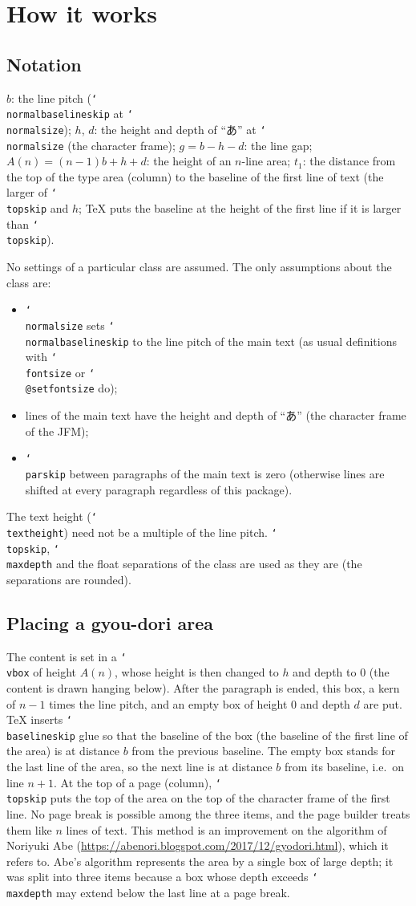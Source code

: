 \documentclass[paper=a4,dvipdfmx]{jlreq}
\newcommand\cs[1]{\texttt{\char`\\#1}}
\begin{document}
\section{How it works}

\subsection{Notation}

$b$: the line pitch (\cs{normalbaselineskip} at \cs{normalsize});
$h$, $d$: the height and depth of ``あ'' at \cs{normalsize} (the character
frame); $g=b-h-d$: the line gap; $A(n)=(n-1)b+h+d$: the height of an $n$-line
area; $t_1$: the distance from the top of the type area (column) to the baseline
of the first line of text (the larger of \cs{topskip} and $h$; \TeX{} puts the
baseline at the height of the first line if it is larger than \cs{topskip}).

No settings of a particular class are assumed. The only assumptions about the
class are:
\begin{itemize}
\item \cs{normalsize} sets \cs{normalbaselineskip} to the line pitch of the main
  text (as usual definitions with \cs{fontsize} or \cs{@setfontsize} do);
\item lines of the main text have the height and depth of ``あ'' (the character
  frame of the JFM);
\item \cs{parskip} between paragraphs of the main text is zero (otherwise lines
  are shifted at every paragraph regardless of this package).
\end{itemize}
The text height (\cs{textheight}) need not be a multiple of the line pitch.
\cs{topskip}, \cs{maxdepth} and the float separations of the class are used as
they are (the separations are rounded).

\subsection{Placing a gyou-dori area}\label{sec:place}

The content is set in a \cs{vbox} of height $A(n)$, whose height is then changed
to $h$ and depth to 0 (the content is drawn hanging below). After the paragraph
is ended, this box, a kern of $n-1$ times the line pitch, and an empty box of
height 0 and depth $d$ are put. \TeX{} inserts \cs{baselineskip} glue so that the
baseline of the box (the baseline of the first line of the area) is at distance
$b$ from the previous baseline. The empty box stands for the last line of the
area, so the next line is at distance $b$ from its baseline, i.e.\ on line $n+1$.
At the top of a page (column), \cs{topskip} puts the top of the area on the top
of the character frame of the first line. No page break is possible among the
three items, and the page builder treats them like $n$ lines of text. This
method is an improvement on the algorithm of Noriyuki Abe
(\url{https://abenori.blogspot.com/2017/12/gyodori.html}), which it refers to.
Abe's algorithm represents the area by a single box of large depth; it was split
into three items because a box whose depth exceeds \cs{maxdepth} may extend below
the last line at a page break.
\end{document}
